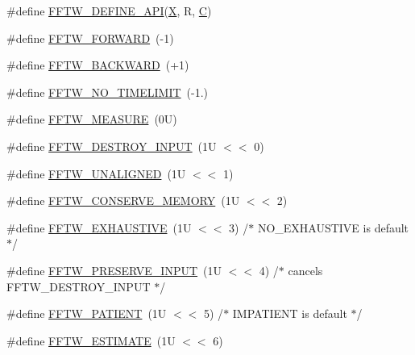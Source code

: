 \begin{DoxyCompactItemize}
\#define \hyperlink{fftw-3_82_82-dll32_2fftw3_8h_a26ae820d7471113c2a4e7f29d11aedd4}{F\-F\-T\-W\-\_\-\-D\-E\-F\-I\-N\-E\-\_\-\-A\-P\-I}(\hyperlink{xyz2cfg_8m_ac51b57a703ba1c5869228690c93e1701}{X}, R, \hyperlink{fileio__fftw3_8cpp_ac4cf4b2ab929bd23951a8676eeac086b}{C})
\item 
\#define \hyperlink{fftw-3_82_82-dll32_2fftw3_8h_a38b39098878bfef014d845651e16755d}{F\-F\-T\-W\-\_\-\-F\-O\-R\-W\-A\-R\-D}~(-\/1)
\item 
\#define \hyperlink{fftw-3_82_82-dll32_2fftw3_8h_ab522872280f9319794c56fabc290e80c}{F\-F\-T\-W\-\_\-\-B\-A\-C\-K\-W\-A\-R\-D}~(+1)
\item 
\#define \hyperlink{fftw-3_82_82-dll32_2fftw3_8h_adc11959487f3594e24d68a408bea4951}{F\-F\-T\-W\-\_\-\-N\-O\-\_\-\-T\-I\-M\-E\-L\-I\-M\-I\-T}~(-\/1.)
\item 
\#define \hyperlink{fftw-3_82_82-dll32_2fftw3_8h_a74838abba9d888010289fc8039b188bd}{F\-F\-T\-W\-\_\-\-M\-E\-A\-S\-U\-R\-E}~(0\-U)
\item 
\#define \hyperlink{fftw-3_82_82-dll32_2fftw3_8h_ad282110582a109aa54215bb849fdcd3a}{F\-F\-T\-W\-\_\-\-D\-E\-S\-T\-R\-O\-Y\-\_\-\-I\-N\-P\-U\-T}~(1\-U $<$$<$ 0)
\item 
\#define \hyperlink{fftw-3_82_82-dll32_2fftw3_8h_a5cd69e615f971ec1076e0cbdc961bae9}{F\-F\-T\-W\-\_\-\-U\-N\-A\-L\-I\-G\-N\-E\-D}~(1\-U $<$$<$ 1)
\item 
\#define \hyperlink{fftw-3_82_82-dll32_2fftw3_8h_adf2fa59f458a62833ff5079112e8cf9a}{F\-F\-T\-W\-\_\-\-C\-O\-N\-S\-E\-R\-V\-E\-\_\-\-M\-E\-M\-O\-R\-Y}~(1\-U $<$$<$ 2)
\item 
\#define \hyperlink{fftw-3_82_82-dll32_2fftw3_8h_a7dc5dd441d6945eaddf302a320ed0656}{F\-F\-T\-W\-\_\-\-E\-X\-H\-A\-U\-S\-T\-I\-V\-E}~(1\-U $<$$<$ 3) /$\ast$ N\-O\-\_\-\-E\-X\-H\-A\-U\-S\-T\-I\-V\-E is default $\ast$/
\item 
\#define \hyperlink{fftw-3_82_82-dll32_2fftw3_8h_abb7108827f62bbe6e662b8f948637d62}{F\-F\-T\-W\-\_\-\-P\-R\-E\-S\-E\-R\-V\-E\-\_\-\-I\-N\-P\-U\-T}~(1\-U $<$$<$ 4) /$\ast$ cancels F\-F\-T\-W\-\_\-\-D\-E\-S\-T\-R\-O\-Y\-\_\-\-I\-N\-P\-U\-T $\ast$/
\item 
\#define \hyperlink{fftw-3_82_82-dll32_2fftw3_8h_a98f8ab33cff17c40865428f652b7ea8e}{F\-F\-T\-W\-\_\-\-P\-A\-T\-I\-E\-N\-T}~(1\-U $<$$<$ 5) /$\ast$ I\-M\-P\-A\-T\-I\-E\-N\-T is default $\ast$/
\item 
\#define \hyperlink{fftw-3_82_82-dll32_2fftw3_8h_afb7257abc054cd5874b3c011437cc801}{F\-F\-T\-W\-\_\-\-E\-S\-T\-I\-M\-A\-T\-E}~(1\-U $<$$<$ 6)
\item 
$$
\end{DoxyCompactItemize}
